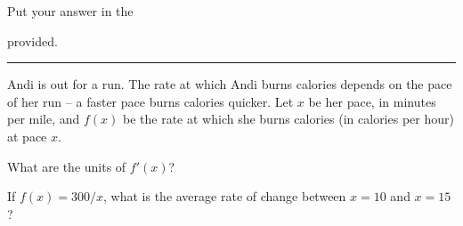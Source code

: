 \documentclass[12pt]{article}
\begin{document}
\begin{minipage}{0.45\linewidth}
  Put your answer in the 
  provided.
\end{minipage}
\hfill
\begin{minipage}{0.5\linewidth}

\end{minipage}
\noindent\hspace*{-2em}\rule{\textwidth+4em}{1pt}%

\begin{enumerate}
  \setcounter{problemnumber}{0}
  \Problem %
  Andi is out for a run.  The rate at which Andi burns calories
  depends on the pace of her run -- a faster pace burns calories
  quicker.  Let $x$ be her pace, in minutes per mile, and $f(x)$ be the
  rate at which she burns calories (in calories per hour) at pace $x$.  
  \begin{enumerate}
    \Part What are the units of $f'(x)$?
    \hfill
    \vfill

    \Part If $f(x) = 300/x$, what is the average rate of change
    between $x=10$ and $x=15$?
    \hfill
    \vfill


  \end{enumerate}


\end{enumerate}
\end{document}
